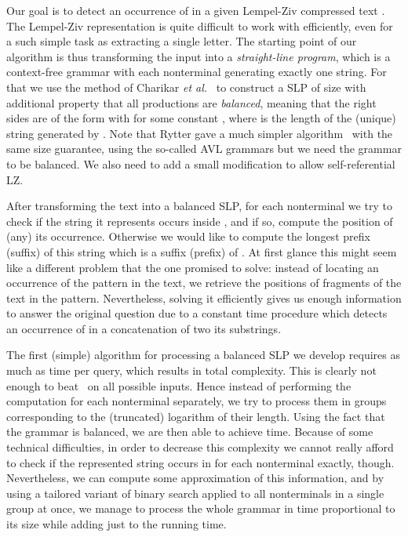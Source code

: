 \documentclass[runningheads]{llncs}
\begin{document}
Our goal is to detect an occurrence of  in a given Lempel-Ziv compressed text . The Lempel-Ziv representation is quite difficult to work with efficiently, even for a such simple task as extracting a single letter. The starting point of our algorithm is thus transforming the input into a {\it straight-line program}, which is a context-free grammar with each nonterminal generating exactly one string. For that we use the method of Charikar {\it et al.}~\cite{CharikarApproximation} to construct a SLP of size  with additional property that all productions are {\it balanced}, meaning that the right sides are of the form  with  for some constant , where  is the length of the (unique) string generated by . Note that Rytter gave a much simpler algorithm~\cite{RytterApproximation} with the same size guarantee, using the so-called AVL grammars but we need the grammar to be balanced. We also need to add a small modification to allow self-referential LZ.

After transforming the text into a balanced SLP, for each nonterminal we try to check if the string it represents occurs inside , and if so, compute the position of (any) its occurrence. Otherwise we would like to compute the longest prefix (suffix) of this string which is a suffix (prefix) of . At first glance this might seem like a different problem that the one promised to solve: instead of locating an occurrence of the pattern in the text, we retrieve the positions of fragments of the text in the pattern. Nevertheless, solving it efficiently gives us enough information to answer the original question due to a constant time procedure which detects an occurrence of  in a concatenation of two its substrings. 

The first (simple) algorithm for processing a balanced SLP we develop requires as much as  time per query, which results in  total complexity. This is clearly not enough to beat~\cite{Farach} on all possible inputs. Hence instead of performing the computation for each nonterminal separately, we try to process them in  groups corresponding to the (truncated) logarithm of their length. Using the fact that the grammar is balanced, we are then able to achieve  time.  Because of some technical difficulties, in order to decrease this complexity we cannot really afford to check if the represented string occurs in  for each nonterminal exactly, though. Nevertheless, we can compute some approximation of this information, and by using a tailored variant of binary search applied to all nonterminals in a single group at once, we manage to process the whole grammar in time proportional to its size while adding just  to the running time. 
\end{document}
